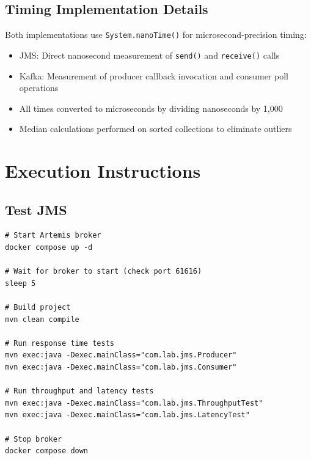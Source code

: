 \documentclass[11pt,a4paper]{article}
\begin{document}
\subsection{Timing Implementation Details}

Both implementations use \texttt{System.nanoTime()} for microsecond-precision timing:
\begin{itemize}
    \item JMS: Direct nanosecond measurement of \texttt{send()} and \texttt{receive()} calls
    \item Kafka: Measurement of producer callback invocation and consumer poll operations
    \item All times converted to microseconds by dividing nanoseconds by 1,000
    \item Median calculations performed on sorted collections to eliminate outliers
\end{itemize}

\newpage
\section{Execution Instructions}

\subsection{Test JMS}
\begin{lstlisting}[style=bashstyle, caption=JMS Test Execution]
# Start Artemis broker
docker compose up -d

# Wait for broker to start (check port 61616)
sleep 5

# Build project
mvn clean compile

# Run response time tests
mvn exec:java -Dexec.mainClass="com.lab.jms.Producer"
mvn exec:java -Dexec.mainClass="com.lab.jms.Consumer"

# Run throughput and latency tests
mvn exec:java -Dexec.mainClass="com.lab.jms.ThroughputTest"
mvn exec:java -Dexec.mainClass="com.lab.jms.LatencyTest"

# Stop broker
docker compose down
\end{lstlisting}
\end{document}
